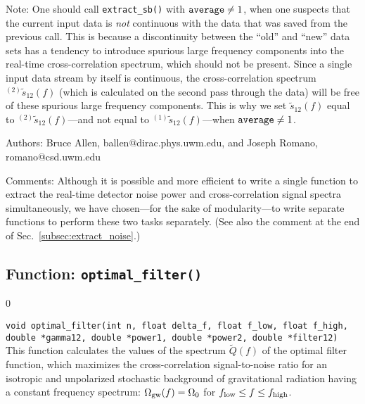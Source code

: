 Note: One should call {\tt extract\_sb()} with 
${\tt average}\ne 1$, when one suspects that the current input data is 
{\it not} continuous with the data that was saved from the previous call.
This is because a discontinuity between the ``old'' and ``new'' data 
sets has a tendency to introduce spurious large frequency components 
into the real-time cross-correlation spectrum, which should not be present.
Since a single input data stream by itself is continuous,  
the cross-correlation spectrum ${}^{(2)}\tilde s_{12}(f)$ (which is 
calculated on the second pass through the data) will be free of these 
spurious large frequency components.
This is why we set $\tilde s_{12}(f)$ equal to 
${}^{(2)}\tilde s_{12}(f)$---and not equal to 
${}^{(1)}\tilde s_{12}(f)$---when ${\tt average}\ne 1$.
%
\begin{description}
\item{Authors:}
Bruce Allen, ballen@dirac.phys.uwm.edu, and Joseph Romano, romano@csd.uwm.edu
\item{Comments:}
Although it is possible and more efficient to write a single function
to extract the real-time detector noise power and cross-correlation signal
spectra simultaneously, we have chosen---for the sake of modularity---to 
write separate functions to perform these two tasks separately.
(See also the comment at the end of Sec.~\ref{subsec:extract_noise}.)
\end{description}
\clearpage

\subsection{Function: {\tt optimal\_filter()}}
\label{subsec:optimal_filter}
\setcounter{equation}0

{\tt void optimal\_filter(int n, float delta\_f, float f\_low,
float f\_high, double *gamma12, double *power1, double *power2,
double *filter12)}\\
%
This function calculates the values of the spectrum $\tilde Q(f)$ of 
the optimal filter function, which maximizes the cross-correlation
signal-to-noise ratio for an isotropic and unpolarized stochastic
background of gravitational radiation having a constant frequency
spectrum:
$\Omega_{\rm gw}(f)=\Omega_0$ for $f_{\rm low}\le f\le f_{\rm high}$.

